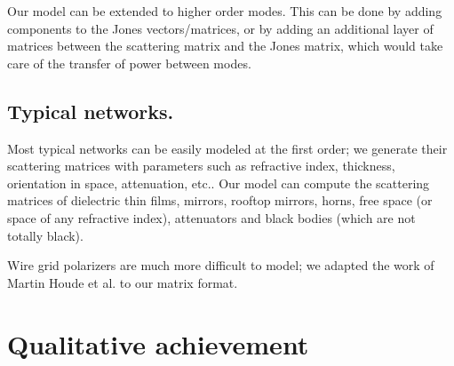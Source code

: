 \documentclass[journal]{IEEEtran}
\begin{document}
Our model can be extended to higher order modes.
This can be done by adding components to the Jones vectors/matrices, or by adding an additional layer of matrices between the scattering matrix and the Jones matrix, which would take care of the transfer of power between modes.

\subsection{Typical networks.}
Most typical networks can be easily modeled at the first order;
we generate their scattering matrices with parameters such as refractive index, thickness, orientation in space, attenuation, etc..
Our model can compute the scattering matrices of dielectric thin films, mirrors, rooftop mirrors, horns, free space (or space of any refractive index), attenuators and black bodies (which are not totally black).

Wire grid polarizers are much more difficult to model; we adapted the work of Martin Houde et al. \cite{houde_2001} to our matrix format.


\section{Qualitative achievement}
\end{document}
